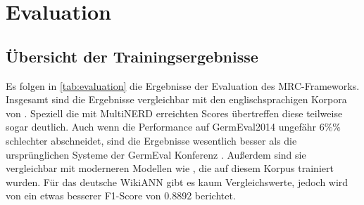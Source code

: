 \chapter{Evaluation}
\label{ch:Evaluation}

\section{Übersicht der Trainingsergebnisse}
\label{ch:Evaluation:sec:Übersicht_der_Trainingsergebnisse}

Es folgen in \autoref{tab:evaluation} die Ergebnisse der Evaluation des MRC-Frameworks. Insgesamt sind die Ergebnisse vergleichbar mit den englischsprachigen Korpora von \cite[6]{li2019unified}. Speziell die mit MultiNERD erreichten Scores übertreffen diese teilweise sogar deutlich. Auch wenn die Performance auf GermEval2014 ungefähr 6\%\% schlechter abschneidet, sind die Ergebnisse wesentlich besser als die ursprünglichen Systeme der GermEval Konferenz \parencite[6]{germeval2014}. Außerdem sind sie vergleichbar mit moderneren Modellen wie \cite[3,4]{riedl-pado-shootout}, die auf diesem Korpus trainiert wurden. Für das deutsche WikiANN gibt es kaum Vergleichswerte, jedoch wird von \cite{Schiesser_2023} ein etwas besserer F1-Score von 0.8892 berichtet.

\begin{table}[!htbp]
	\centering
	\caption{Evaluation des MRC-Frameworks}
	\label{tab:evaluation}
\end{table}

